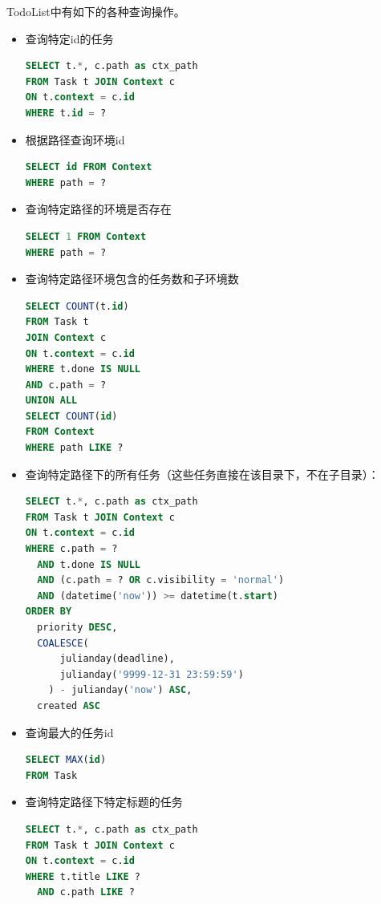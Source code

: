 \documentclass[logo,reportComp]{thesis}
\begin{document}
TodoList中有如下的各种查询操作。
\begin{itemize}
\item 查询特定id的任务
\begin{lstlisting}[language=SQL]
SELECT t.*, c.path as ctx_path
FROM Task t JOIN Context c
ON t.context = c.id
WHERE t.id = ?
\end{lstlisting}
\item 根据路径查询环境id
\begin{lstlisting}[language=SQL]
SELECT id FROM Context
WHERE path = ?
\end{lstlisting}
\item 查询特定路径的环境是否存在
\begin{lstlisting}[language=SQL]
SELECT 1 FROM Context
WHERE path = ?
\end{lstlisting}
\item 查询特定路径环境包含的任务数和子环境数
\begin{lstlisting}[language=SQL]
SELECT COUNT(t.id)
FROM Task t
JOIN Context c
ON t.context = c.id
WHERE t.done IS NULL
AND c.path = ?
UNION ALL
SELECT COUNT(id)
FROM Context
WHERE path LIKE ?
\end{lstlisting}
\item 查询特定路径下的所有任务（这些任务直接在该目录下，不在子目录）：
\begin{lstlisting}[language=SQL]
SELECT t.*, c.path as ctx_path
FROM Task t JOIN Context c
ON t.context = c.id
WHERE c.path = ?
  AND t.done IS NULL
  AND (c.path = ? OR c.visibility = 'normal')
  AND (datetime('now')) >= datetime(t.start)
ORDER BY
  priority DESC,
  COALESCE(
      julianday(deadline),
      julianday('9999-12-31 23:59:59')
    ) - julianday('now') ASC,
  created ASC
\end{lstlisting}
\item 查询最大的任务id
\begin{lstlisting}[language=SQL]
SELECT MAX(id)
FROM Task
\end{lstlisting}
\item 查询特定路径下特定标题的任务
\begin{lstlisting}[language=SQL]
SELECT t.*, c.path as ctx_path
FROM Task t JOIN Context c
ON t.context = c.id
WHERE t.title LIKE ?
  AND c.path LIKE ?
\end{lstlisting}
\end{itemize}
\end{document}

